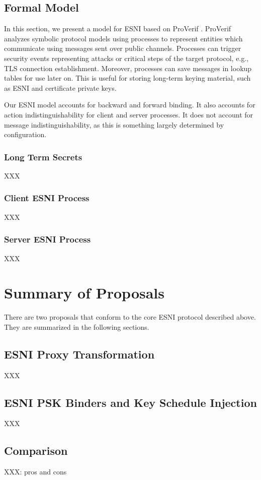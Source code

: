 \documentclass[twoside]{article}
\theoremstyle{definition}
\begin{document}
\subsection{Formal Model}

In this section, we present a model for ESNI based on ProVerif \cite{28,32}. ProVerif analyzes symbolic protocol
models using processes to represent entities which communicate using messages sent over public channels. Processes
can trigger security events representing attacks or critical steps of the target protocol, e.g., TLS connection establishment.
Moreover, processes can save messages in lookup tables for use later on. This is useful for storing long-term keying
material, such as ESNI and certificate private keys. 

Our ESNI model accounts for backward and forward binding. It also accounts for action indistinguishability for client
and server processes. It does not account for message indistinguishability, as this is something largely determined
by configuration. 

\subsubsection{Long Term Secrets}
XXX

\subsubsection{Client ESNI Process}
XXX

\subsubsection{Server ESNI Process}
XXX

\section{Summary of Proposals}

There are two proposals that conform to the core ESNI protocol described above. They are
summarized in the following sections.

\subsection{ESNI Proxy Transformation}
XXX

\subsection{ESNI PSK Binders and Key Schedule Injection}
XXX

\subsection{Comparison}
XXX: pros and cons



\end{document}
